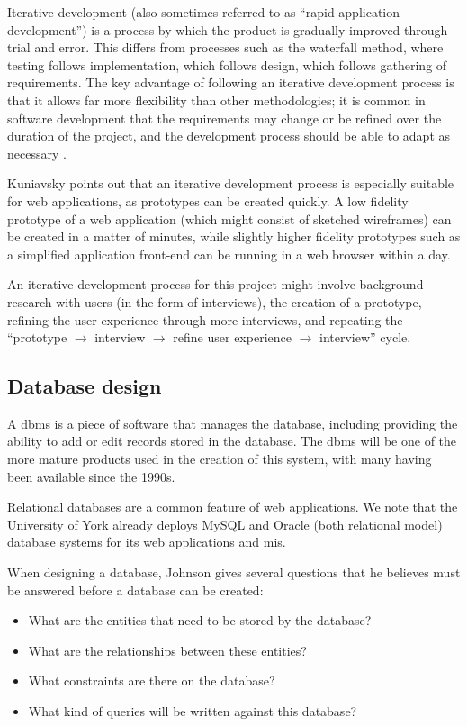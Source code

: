 \documentclass[]{scrartcl}
\begin{document}

Iterative development (also sometimes referred to as ``rapid application
development'') is a process by which the product is gradually improved through
trial and error. This differs from processes such as the waterfall method,
where testing follows implementation, which follows design, which follows
gathering of requirements. The key advantage of following an iterative
development process is that it allows far more flexibility than other
methodologies; it is common in software development that the requirements may
change or be refined over the duration of the project, and the development
process should be able to adapt as necessary \cite{kuniavsky2003userexperience}.

Kuniavsky points out that an iterative development process is especially
suitable for web applications, as prototypes can be created quickly. A low
fidelity prototype of a web application (which might consist of sketched
wireframes) can be created in a matter of minutes, while slightly higher
fidelity prototypes such as a simplified application front-end can be running
in a web browser within a day.

An iterative development process for this project might involve background
research with users (in the form of interviews), the creation of a prototype,
refining the user experience through more interviews, and repeating the
``prototype $\rightarrow$ interview $\rightarrow$ refine user experience
$\rightarrow$ interview'' cycle.

\subsection{Database design}

A \gls{dbms} is a piece of software that manages the
database, including providing the ability to add or edit records stored in the
database. The \gls{dbms} will be one of the more mature products used in the
creation of this system, with many having been available since the 1990s.

Relational databases are a common feature of web applications. We note
that the University of York already deploys MySQL and Oracle (both relational
model) database systems for its web applications and \gls{mis}.

When designing a database, Johnson \cite{DatabaseModelsLanguagesDesign} gives
several questions that he believes must be answered before a database can be
created:

\begin{itemize}
  \item What are the entities that need to be stored by the database?
  \item What are the relationships between these entities?
  \item What constraints are there on the database?
  \item What kind of queries will be written against this database?
\end{itemize}
\end{document}
